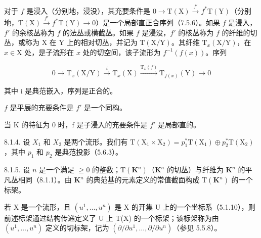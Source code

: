 对于 \(f\) 是浸入（分别地，浸没），其充要条件是 \(0 \to \mathrm{T}(\mathrm{X}) \xrightarrow{f'} f^* \mathrm{T}(\mathrm{Y})\)（分别地，\(\mathrm{T}(\mathrm{X}) \xrightarrow{f'} f^* \mathrm{T}(\mathrm{Y}) \to 0\)）是一个局部直正合序列（7.5.6）。如果 \(f\) 是浸入，\(f'\) 的余核丛称为 \(f\) 的法丛或横截丛。如果 \(f\) 是浸没，\(f'\) 的核丛称为 \(f\) 的纤维的切丛，或称为 X 在 Y 上的相对切丛，并记为 \(\mathrm{T}(\mathrm{X}/\mathrm{Y})\)。其纤维 \(\mathrm{T}_x(\mathrm{X}/\mathrm{Y})\)，在 \(x \in \mathrm{X}\) 处，是子流形在 \(x\) 处的切空间，该子流形为 \(f^{-1}(f(x))\)。序列

\[
0 \longrightarrow \mathrm{T} _ {x} (\mathrm{X} / \mathrm{Y}) \stackrel {i} {\longrightarrow} \mathrm{T} _ {x} (\mathrm{X}) \stackrel {\mathrm{T} _ {x} (f)} {\longrightarrow} \mathrm{T} _ {f (x)} (\mathrm{Y}) \longrightarrow 0
\]

其中 i 是典范嵌入，序列是正合的。

\(f\) 是平展的充要条件是 \(f'\) 是一个同构。

当 K 的特征为 0 时，f 是子浸入的充要条件是 \(f'\) 是局部直的。

8.1.4. 设 \(X_{1}\) 和 \(X_{2}\) 是两个流形。我们有 \(\mathrm{T}(\mathrm{X}_{1} \times \mathrm{X}_{2}) = p_{1}^{*}\mathrm{T}(\mathrm{X}_{1}) \oplus p_{2}^{*}\mathrm{T}(\mathrm{X}_{2})\)，其中 \(p_{1}\) 和 \(p_{2}\) 是典范投影（5.6.3）。

8.1.5. 设 \(n\) 是一个满足 \(\geqslant 0\) 的整数；\(\mathrm{T}(\mathbf{K}^{n})\)（\(\mathbf{K}^{n}\) 的切丛）与纤维为 \(\mathbf{K}^{n}\) 的平凡丛相同（8.1.1）。由 \(\mathbf{K}^{n}\) 的典范基的元素定义的常值截面构成 \(\mathrm{T}(\mathbf{K}^{n})\) 的一个标架。

若 X 是一个流形，且 \((u^{1},\ldots,u^{n})\) 是 X 的开集 U 上的一个坐标系（5.1.10），则前述标架通过结构传递定义了 U 上 T(X) 的一个标架；该标架称为由 \((u^{1},\ldots,u^{n})\) 定义的切标架，记为 \((\partial/\partial u^{1},\ldots,\partial/\partial u^{n})\)（参见 5.5.8）。

